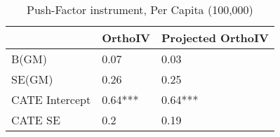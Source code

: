 \begin{table}\centering\caption{Push-Factor instrument, Per Capita (100,000)}\begin{tabular}{lll}
\toprule
                & OrthoIV   & Projected OrthoIV   \\
\midrule
 B(GM)          & 0.07      & 0.03                \\
 SE(GM)         & 0.26      & 0.25                \\
 CATE Intercept & 0.64***   & 0.64***             \\
 CATE SE        & 0.2       & 0.19                \\
\bottomrule
\end{tabular}\end{table}